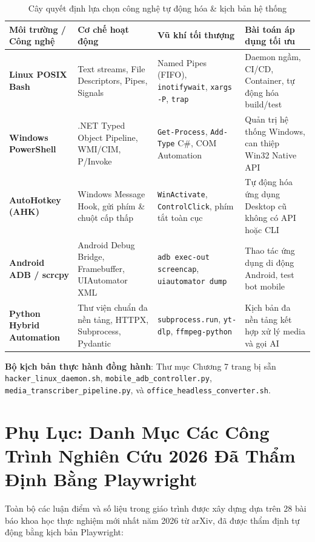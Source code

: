 \documentclass[a4paper,11pt]{report}
\begin{document}
\begin{table}[htbp]
\centering
\small
\caption{Cây quyết định lựa chọn công nghệ tự động hóa \& kịch bản hệ thống}
\vspace{0.5em}
\begin{tabularx}{\textwidth}{L{3.2cm} L{3.8cm} L{4.5cm} Y}
\toprule
\textbf{Môi trường / Công nghệ} & \textbf{Cơ chế hoạt động} & \textbf{Vũ khí tối thượng} & \textbf{Bài toán áp dụng tối ưu} \\
\midrule
\textbf{Linux POSIX Bash} & Text streams, File Descriptors, Pipes, Signals & Named Pipes (FIFO), \texttt{inotifywait}, \texttt{xargs -P}, \texttt{trap} & Daemon ngầm, CI/CD, Container, tự động hóa build/test \\
\textbf{Windows PowerShell} & .NET Typed Object Pipeline, WMI/CIM, P/Invoke & \texttt{Get-Process}, \texttt{Add-Type} C\#, COM Automation & Quản trị hệ thống Windows, can thiệp Win32 Native API \\
\textbf{AutoHotkey (AHK)} & Windows Message Hook, gửi phím \& chuột cấp thấp & \texttt{WinActivate}, \texttt{ControlClick}, phím tắt toàn cục & Tự động hóa ứng dụng Desktop cũ không có API hoặc CLI \\
\textbf{Android ADB / scrcpy} & Android Debug Bridge, Framebuffer, UIAutomator XML & \texttt{adb exec-out screencap}, \texttt{uiautomator dump} & Thao tác ứng dụng di động Android, test bot mobile \\
\textbf{Python Hybrid Automation} & Thư viện chuẩn đa nền tảng, HTTPX, Subprocess, Pydantic & \texttt{subprocess.run}, \texttt{yt-dlp}, \texttt{ffmpeg-python} & Kịch bản đa nền tảng kết hợp xử lý media và gọi AI \\
\bottomrule
\end{tabularx}
\end{table}

\noindent\textbf{Bộ kịch bản thực hành đồng hành}: Thư mục Chương 7 trang bị sẵn \texttt{hacker\_linux\_daemon.sh}, \texttt{mobile\_adb\_controller.py}, \texttt{media\_transcriber\_pipeline.py}, và \texttt{office\_headless\_converter.sh}.

\chapter*{Phụ Lục: Danh Mục Các Công Trình Nghiên Cứu 2026 Đã Thẩm Định Bằng Playwright}

Toàn bộ các luận điểm và số liệu trong giáo trình được xây dựng dựa trên 28 bài báo khoa học thực nghiệm mới nhất năm 2026 từ arXiv, đã được thẩm định tự động bằng kịch bản Playwright:
\end{document}
